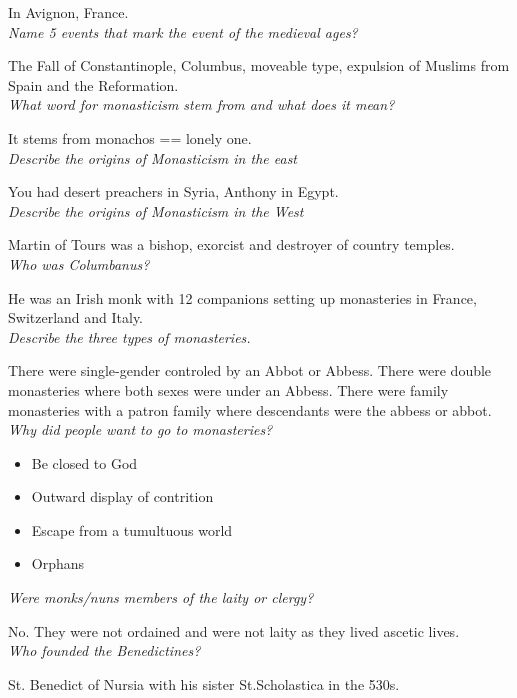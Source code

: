 \documentclass[12pt]{article}
\begin{document}
In Avignon, France.\\

\textit{Name 5 events that mark the event of the medieval ages?}

The Fall of Constantinople, Columbus, moveable type, expulsion of Muslims from Spain and the Reformation.\\

\textit{What word for monasticism stem from and what does it mean?}

It stems from monachos == lonely one.\\

\textit{Describe the origins of Monasticism in the east}

You had desert preachers in Syria, Anthony in Egypt.\\

\textit{Describe the origins of Monasticism in the West}

Martin of Tours was a bishop, exorcist and destroyer of country temples.\\

\textit{Who was Columbanus?}

He was an Irish monk with 12 companions setting up monasteries in France, Switzerland and Italy.\\

\textit{Describe the three types of monasteries.}

There were single-gender controled by an Abbot or Abbess. There were double monasteries where both sexes were under an Abbess. There were family monasteries with a patron family where descendants were the abbess or abbot.\\

\textit{Why did people want to go to monasteries?}
\begin{itemize}
	\item Be closed to God
	\item Outward display of contrition
	\item Escape from a tumultuous world
	\item Orphans
\end{itemize}

\textit{Were monks/nuns members of the laity or clergy?}

No. They were not ordained and were not laity as they lived ascetic lives.\\

\textit{Who founded the Benedictines?}

St. Benedict of Nursia with his sister St.Scholastica in the 530s.
\end{document}

